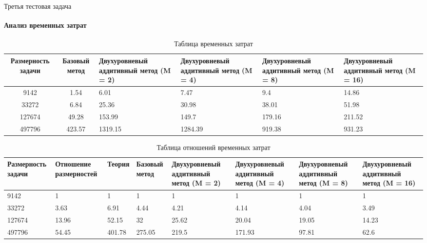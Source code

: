 \documentclass{beamer}
\begin{document}
\begin{frame}{Третья тестовая задача}
\framesubtitle{Анализ временных затрат}
\begin{table}
\begin{adjustbox}{max width=0.9\textwidth}
\begin{tabular}{|c|c|p{2.8cm}|p{2.8cm}|p{2.8cm}|p{2.8cm}|}
\hline
Размерность задачи & Базовый метод & Двухуровневый аддитивный метод (M = 2) & Двухуровневый аддитивный метод (M = 4) & Двухуровневый аддитивный метод (M = 8) & Двухуровневый аддитивный метод (M = 16) \\
\hline
9142 & 1.54 & 6.01 & 7.47 & 9.4 & 14.86 \\
\hline
33272 & 6.84 & 25.36 & 30.98 & 38.01 & 51.98 \\
\hline
127674 & 49.28 & 153.99 & 149.7 & 179.16 & 211.52 \\
\hline
497796 & 423.57 & 1319.15 & 1284.39 & 919.38 & 931.23 \\
\hline
\end{tabular}
\end{adjustbox}
\caption{Таблица временных затрат}
\end{table}

\begin{table}
\begin{adjustbox}{max width=\textwidth}
\begin{tabular}{|p{2cm}|p{2.3cm}|l|p{1.5cm}|p{2.8cm}|p{2.8cm}|p{2.8cm}|p{2.8cm}|}
\hline
Размерность задачи & Отношение размерностей & Теория & Базовый метод & Двухуровневый аддитивный метод (M = 2) & Двухуровневый аддитивный метод (M = 4) & Двухуровневый аддитивный метод (M = 8) & Двухуровневый аддитивный метод (M = 16) \\
\hline
9142 & 1 & 1 & 1 & 1 & 1 & 1 & 1 \\
\hline
33272 & 3.63 & 6.91 & 4.44 & 4.21 & 4.14 & 4.04 & 3.49 \\
\hline
127674 & 13.96 & 52.15 & 32 & 25.62 & 20.04 & 19.05 & 14.23 \\
\hline
497796 & 54.45 & 401.78 & 275.05 & 219.5 & 171.93 & 97.81 & 62.6 \\
\hline
\end{tabular}
\end{adjustbox}
\caption{Таблица отношений временных затрат}
\end{table}
\end{frame}
\end{document}
